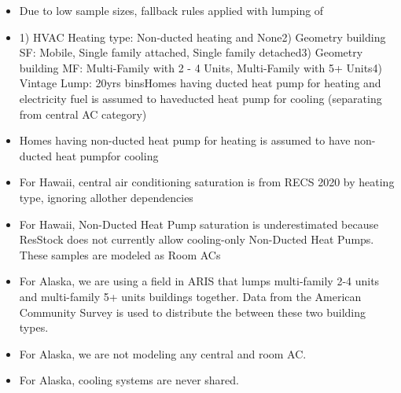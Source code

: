 \begin{itemize}
\item Due to low sample sizes, fallback rules applied with lumping of
\item 1) HVAC Heating type: Non-ducted heating and None2) Geometry building SF: Mobile, Single family attached, Single family detached3) Geometry building MF: Multi-Family with 2 - 4 Units, Multi-Family with 5+ Units4) Vintage Lump: 20yrs binsHomes having ducted heat pump for heating and electricity fuel is assumed to haveducted heat pump for cooling (separating from central AC category)
\item Homes having non-ducted heat pump for heating is assumed to have non-ducted heat pumpfor cooling
\item For Hawaii, central air conditioning saturation is from RECS 2020 by heating type, ignoring allother dependencies
\item For Hawaii, Non-Ducted Heat Pump saturation is underestimated because ResStock does not currently allow cooling-only Non-Ducted Heat Pumps. These samples are modeled as Room ACs
\item For Alaska, we are using a field in ARIS that lumps multi-family 2-4 units and multi-family 5+ units buildings together. Data from the American Community Survey is used to distribute the between these two building types.
\item For Alaska, we are not modeling any central and room AC.
\item For Alaska, cooling systems are never shared.
\end{itemize}

